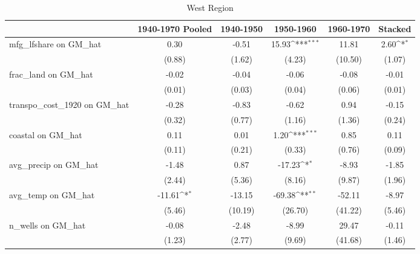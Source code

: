 \begin{table}[htbp]\centering
\def\sym#1{\ifmmode^{#1}\else\(^{#1}\)\fi}
\caption{West Region}
\begin{tabular}{l*{5}{c}}
\toprule
                &\multicolumn{1}{c}{1940-1970 Pooled}&\multicolumn{1}{c}{1940-1950}&\multicolumn{1}{c}{1950-1960}&\multicolumn{1}{c}{1960-1970}&\multicolumn{1}{c}{Stacked}\\
\midrule
mfg\_lfshare on GM\_hat&     0.30         &    -0.51         &    15.93\sym{***}&    11.81         &     2.60\sym{*}  \\
                &   (0.88)         &   (1.62)         &   (4.23)         &  (10.50)         &   (1.07)         \\
\addlinespace
frac\_land on GM\_hat&    -0.02         &    -0.04         &    -0.06         &    -0.08         &    -0.01         \\
                &   (0.01)         &   (0.03)         &   (0.04)         &   (0.06)         &   (0.01)         \\
\addlinespace
transpo\_cost\_1920 on GM\_hat&    -0.28         &    -0.83         &    -0.62         &     0.94         &    -0.15         \\
                &   (0.32)         &   (0.77)         &   (1.16)         &   (1.36)         &   (0.24)         \\
\addlinespace
coastal on GM\_hat&     0.11         &     0.01         &     1.20\sym{***}&     0.85         &     0.11         \\
                &   (0.11)         &   (0.21)         &   (0.33)         &   (0.76)         &   (0.09)         \\
\addlinespace
avg\_precip on GM\_hat&    -1.48         &     0.87         &   -17.23\sym{*}  &    -8.93         &    -1.85         \\
                &   (2.44)         &   (5.36)         &   (8.16)         &   (9.87)         &   (1.96)         \\
\addlinespace
avg\_temp on GM\_hat&   -11.61\sym{*}  &   -13.15         &   -69.38\sym{**} &   -52.11         &    -8.97         \\
                &   (5.46)         &  (10.19)         &  (26.70)         &  (41.22)         &   (5.46)         \\
\addlinespace
n\_wells on GM\_hat&    -0.08         &    -2.48         &    -8.99         &    29.47         &    -0.11         \\
                &   (1.23)         &   (2.77)         &   (9.69)         &  (41.68)         &   (1.46)         \\

\end{tabular}
\end{table}
